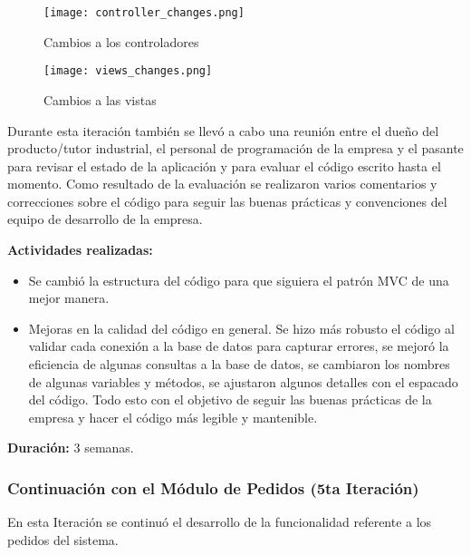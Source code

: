 \begin{figure}[H]
    \centering
    \texttt{[image: controller\_changes.png]}
    \caption{Cambios a los controladores}
    \label{fig:controller_changes}
\end{figure}

\begin{figure}[H]
    \centering
    \texttt{[image: views\_changes.png]}
    \caption{Cambios a las vistas}
    \label{fig:views_changes}
\end{figure}

Durante esta iteración también se llevó a cabo una reunión entre el dueño del producto/tutor industrial, el personal de programación de la empresa y el pasante para revisar el estado de la aplicación y para evaluar el código escrito hasta el momento. Como resultado de la evaluación se realizaron varios comentarios y correcciones sobre el código para seguir las buenas prácticas y convenciones del equipo de desarrollo de la empresa.

\vspace{0.3cm}
\textbf{Actividades realizadas:}
\begin{itemize}
    \item Se cambió la estructura del código para que siguiera el patrón MVC de una mejor manera.
    \item Mejoras en la calidad del código en general. Se hizo más robusto el código al validar cada conexión a la base de datos para capturar errores, se mejoró la eficiencia de algunas consultas a la base de datos, se cambiaron los nombres de algunas variables y métodos, se ajustaron algunos detalles con el espacado del código. Todo esto con el objetivo de seguir las buenas prácticas de la empresa y hacer el código más legible y mantenible.
\end{itemize}

\textbf{Duración:} 3 semanas.

\subsubsection{Continuación con el Módulo de Pedidos (5ta Iteración)}
En esta Iteración se continuó el desarrollo de la funcionalidad referente a los pedidos del sistema.

